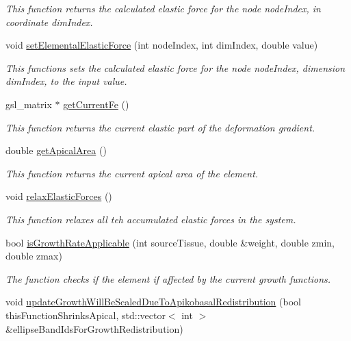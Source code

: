 \begin{DoxyCompactItemize}
\begin{DoxyCompactList}\small\item\em This function returns the calculated elastic force for the node node\+Index, in coordinate dim\+Index. \end{DoxyCompactList}\item 
\hypertarget{classShapeBase_ae4d82f91854fff8473dcd722ab423e10}{}void \hyperlink{classShapeBase_ae4d82f91854fff8473dcd722ab423e10}{set\+Elemental\+Elastic\+Force} (int node\+Index, int dim\+Index, double value)\label{classShapeBase_ae4d82f91854fff8473dcd722ab423e10}

\begin{DoxyCompactList}\small\item\em This functions sets the calculated elastic force for the node node\+Index, dimension dim\+Index, to the input value. \end{DoxyCompactList}\item 
gsl\+\_\+matrix $\ast$ \hyperlink{classShapeBase_abb8aa4fb16ea7b545e6b8e13b95d6b6e}{get\+Current\+Fe} ()
\begin{DoxyCompactList}\small\item\em This function returns the current elastic part of the deformation gradient. \end{DoxyCompactList}\item 
\hypertarget{classShapeBase_a5b8f0f737818ca01e15b7652c38d4900}{}double \hyperlink{classShapeBase_a5b8f0f737818ca01e15b7652c38d4900}{get\+Apical\+Area} ()\label{classShapeBase_a5b8f0f737818ca01e15b7652c38d4900}

\begin{DoxyCompactList}\small\item\em This function returns the current apical area of the element. \end{DoxyCompactList}\item 
void \hyperlink{classShapeBase_a40a3c680c1b96ae81d6bfe21a0127655}{relax\+Elastic\+Forces} ()
\begin{DoxyCompactList}\small\item\em This function relaxes all teh accumulated elastic forces in the system. \end{DoxyCompactList}\item 
bool \hyperlink{classShapeBase_aa0f0cc5b33f3e12d91a246cc591c346c}{is\+Growth\+Rate\+Applicable} (int source\+Tissue, double \&weight, double zmin, double zmax)
\begin{DoxyCompactList}\small\item\em The function checks if the element if affected by the current growth functions. \end{DoxyCompactList}\item 
\hypertarget{classShapeBase_a605f5ce36b0d86330fbc535f553ae140}{}void \hyperlink{classShapeBase_a605f5ce36b0d86330fbc535f553ae140}{update\+Growth\+Will\+Be\+Scaled\+Due\+To\+Apikobasal\+Redistribution} (bool this\+Function\+Shrinks\+Apical, std\+::vector$<$ int $>$ \&ellipse\+Band\+Ids\+For\+Growth\+Redistribution)\label{classShapeBase_a605f5ce36b0d86330fbc535f553ae140}


\end{DoxyCompactItemize}
